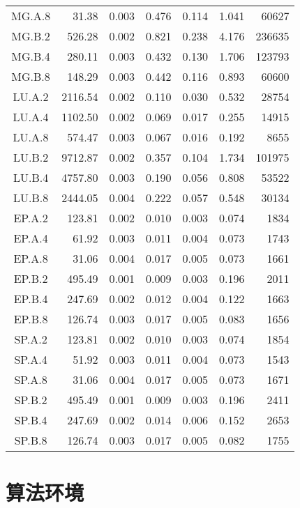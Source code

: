 \begin{ThreePartTable}
\begin{longtable}[c]{c*{6}{r}}
    MG.A.8 & 31.38 & 0.003 & 0.476 & 0.114 & 1.041 & 60627 \\
    MG.B.2 & 526.28 & 0.002 & 0.821 & 0.238 & 4.176 & 236635 \\
    MG.B.4 & 280.11 & 0.003 & 0.432 & 0.130 & 1.706 & 123793 \\
    MG.B.8 & 148.29 & 0.003 & 0.442 & 0.116 & 0.893 & 60600 \\
    LU.A.2 & 2116.54 & 0.002 & 0.110 & 0.030 & 0.532 & 28754 \\
    LU.A.4 & 1102.50 & 0.002 & 0.069 & 0.017 & 0.255 & 14915 \\
    LU.A.8 & 574.47 & 0.003 & 0.067 & 0.016 & 0.192 & 8655 \\
    LU.B.2 & 9712.87 & 0.002 & 0.357 & 0.104 & 1.734 & 101975 \\
    LU.B.4 & 4757.80 & 0.003 & 0.190 & 0.056 & 0.808 & 53522 \\
    LU.B.8 & 2444.05 & 0.004 & 0.222 & 0.057 & 0.548 & 30134 \\
    EP.A.2 & 123.81 & 0.002 & 0.010 & 0.003 & 0.074 & 1834 \\
    EP.A.4 & 61.92 & 0.003 & 0.011 & 0.004 & 0.073 & 1743 \\
    EP.A.8 & 31.06 & 0.004 & 0.017 & 0.005 & 0.073 & 1661 \\
    EP.B.2 & 495.49 & 0.001 & 0.009 & 0.003 & 0.196 & 2011 \\
    EP.B.4 & 247.69 & 0.002 & 0.012 & 0.004 & 0.122 & 1663 \\
    EP.B.8 & 126.74 & 0.003 & 0.017 & 0.005 & 0.083 & 1656 \\
    SP.A.2 & 123.81 & 0.002 & 0.010 & 0.003 & 0.074 & 1854 \\
    SP.A.4 & 51.92 & 0.003 & 0.011 & 0.004 & 0.073 & 1543 \\
    SP.A.8 & 31.06 & 0.004 & 0.017 & 0.005 & 0.073 & 1671 \\
    SP.B.2 & 495.49 & 0.001 & 0.009 & 0.003 & 0.196 & 2411 \\
    SP.B.4 \tnote{a} & 247.69 & 0.002 & 0.014 & 0.006 & 0.152 & 2653 \\
    SP.B.8 \tnote{b} & 126.74 & 0.003 & 0.017 & 0.005 & 0.082 & 1755 \\
    \bottomrule
  \end{longtable}
\end{ThreePartTable}

\section{算法环境}

